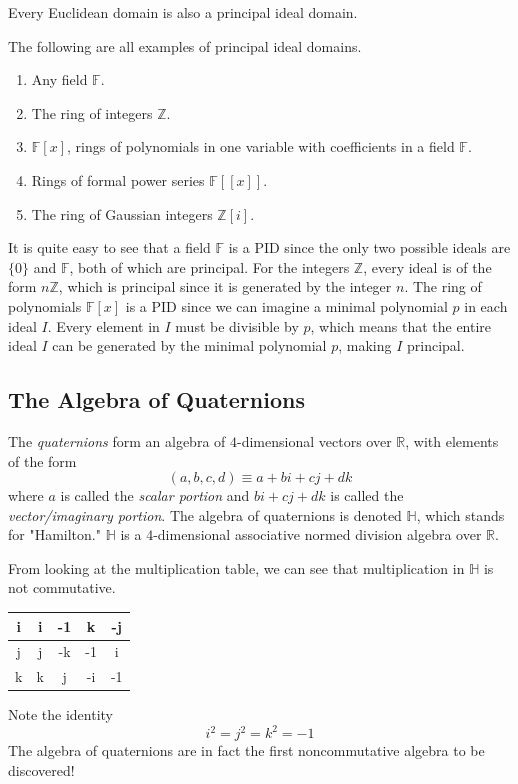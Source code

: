 \documentclass{article}
\begin{document}
    \begin{proposition}
      Every Euclidean domain is also a principal ideal domain. 
    \end{proposition}

    \begin{example}
      The following are all examples of principal ideal domains. 
      \begin{enumerate}
        \item Any field $\mathbb{F}$. 
        \item The ring of integers $\mathbb{Z}$. 
        \item $\mathbb{F}[x]$, rings of polynomials in one variable with coefficients in a field $\mathbb{F}$. 
        \item Rings of formal power series $\mathbb{F}[[x]]$. 
        \item The ring of Gaussian integers $\mathbb{Z}[i]$. 
      \end{enumerate}
    \end{example}

    It is quite easy to see that a field $\mathbb{F}$ is a PID since the only two possible ideals are $\{0\}$ and $\mathbb{F}$, both of which are principal. For the integers $\mathbb{Z}$, every ideal is of the form $n\mathbb{Z}$, which is principal since it is generated by the integer $n$. The ring of polynomials $\mathbb{F}[x]$ is a PID since we can imagine a minimal polynomial $p$ in each ideal $I$. Every element in $I$ must be divisible by $p$, which means that the entire ideal $I$ can be generated by the minimal polynomial $p$, making $I$ principal. 

  \subsection{The Algebra of Quaternions}

    \begin{definition}
      The \textit{quaternions} form an algebra of $4$-dimensional vectors over $\mathbb{R}$, with elements of the form
      \[(a, b, c, d) \equiv a + bi + cj + dk\]
      where $a$ is called the \textit{scalar portion} and $bi + cj + dk$ is called the \textit{vector/imaginary portion}. The algebra of quaternions is denoted $\mathbb{H}$, which stands for "Hamilton." $\mathbb{H}$ is a $4$-dimensional associative normed division algebra over $\mathbb{R}$. 
    \end{definition}

    From looking at the multiplication table, we can see that multiplication in $\mathbb{H}$ is not commutative. 
    \begin{center}
      \begin{tabular}{|c|c|c|c|c|}
      \hline
      i & i & -1 & k & -j \\ 
      \hline
      j & j & -k & -1 & i \\ 
      \hline
      k & k & j & -i & -1 \\ 
      \hline
      \end{tabular}
    \end{center}
    Note the identity 
    \[i^2 = j^2 = k^2 = -1\]
    The algebra of quaternions are in fact the first noncommutative algebra to be discovered! 
\end{document}
